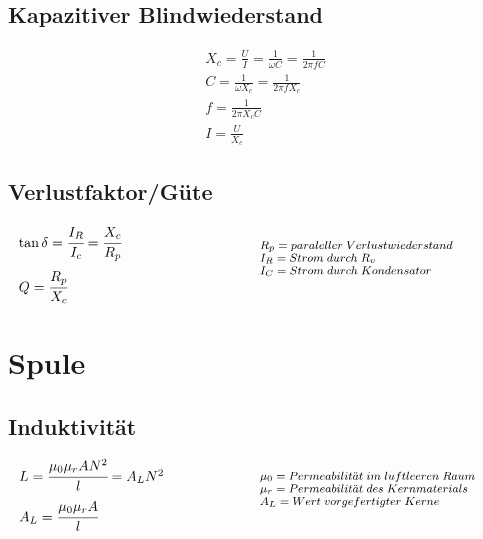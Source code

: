 \documentclass[12pt,a5paper,ngerman,titlepage]{article}
\begin{document}
\subsection{Kapazitiver Blindwiederstand}

\begin{align*}
&X_{c} = \frac{U}{I} = \frac{1}{\omega C} = \frac{1}{2\pi fC} \\[5pt]
&C=\frac{1}{\omega X_{c}} = \frac{1}{2\pi fX_{c}} \\[5pt]
&f=\frac{1}{2\pi X_{c}C} \\[5pt]
&I =\frac{U}{X_{c}}
\end{align*}
\subsection{Verlustfaktor/Güte}
\[
\begin{minipage}{.5\linewidth}
	
  $\tan \delta = \cfrac{I_{R}}{I_{c}} = \cfrac{X_{c}}{R_{p}}$\\[5pt]
  $Q = \cfrac{R_{p}}{X_{c}}$
\end{minipage}%
\begin{minipage}{.5\linewidth}
  \fontsize{8pt}{9pt}\selectfont
  $R_{p} = paraleller \; Verlustwiederstand$ \\
  $I_{R} = Strom \; durch \; R_{v}$ \\
  $I_{C} = Strom \; durch \; Kondensator$ \\

\end{minipage}
\]
\newpage
\section{Spule}
\subsection{Induktivität}
\[
\begin{minipage}{.5\linewidth}
  $L=\cfrac{\mu_{0}\mu_{r}AN^2}{l}=A_{L}N^2$ \\[5pt]
  $A_{L}=\cfrac{\mu_{0}\mu_{r}A}{l}$
\end{minipage}%
\begin{minipage}{.5\linewidth}
  \fontsize{8pt}{9pt}\selectfont
  $\mu_{0} = Permeabilit\ddot{a}t \;im \; luftleeren \; Raum$ \\
  $\mu_{r} = Permeabilit\ddot{a}t \; des \; Kernmaterials$ \\
  $A_{L} = Wert \; vorgefertigter \; Kerne$ \\

\end{minipage}
\]
\end{document}
